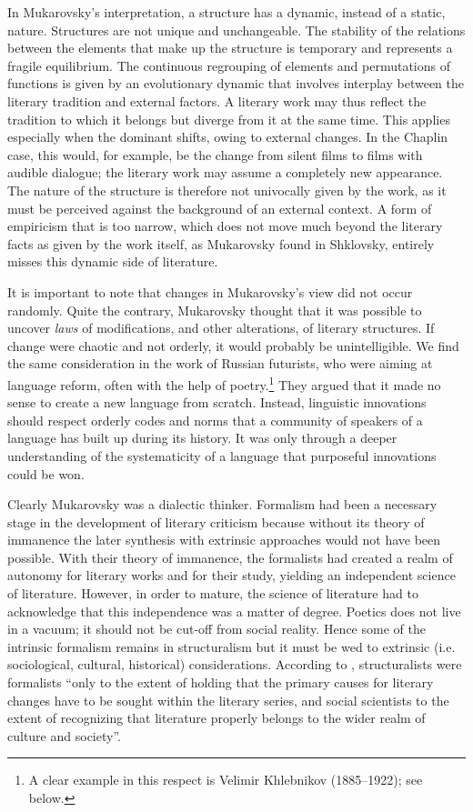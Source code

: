 \documentclass[output=paper]{langscibook}
\begin{document}
In Mukarovsky's interpretation, a structure has a dynamic, instead of a static, nature. Structures are not unique and unchangeable. The stability of the relations between the elements that make up the structure is temporary and represents a fragile equilibrium. The continuous regrouping of elements and permutations of functions is given by an evolutionary dynamic that involves interplay between the literary tradition and external factors. A literary work may thus reflect the tradition to which it belongs but diverge from it at the same time. This applies especially when the dominant shifts, owing to external changes. In the Chaplin case, this would, for example, be the change from silent films to films with audible dialogue; the literary work may assume a completely new appearance. The nature of the structure is therefore not univocally given by the work, as it must be perceived against the background of an external context. A form of empiricism that is too narrow, which does not move much beyond the literary facts as given by the work itself, as Mukarovsky found in Shklovsky, entirely misses this dynamic side of literature.

It is important to note that changes in Mukarovsky's view did not occur randomly. Quite the contrary, Mukarovsky thought that it was possible to uncover \emph{laws} of modifications, and other alterations, of literary structures. If change were chaotic and not orderly, it would probably be unintelligible. We find the same consideration in the work of Russian futurists, who were aiming at language reform, often with the help of poetry.\footnote{A clear example in this respect is Velimir Khlebnikov (1885--1922); see below.} They argued that it made no sense to create a new language from scratch. Instead, linguistic innovations should respect orderly codes and norms that a community of speakers of a language has built up during its history. It was only through a deeper understanding of the systematicity of a language that purposeful innovations could be won. 

Clearly Mukarovsky was a dialectic thinker. Formalism had been a necessary stage in the development of literary criticism because without its theory of immanence the later synthesis with extrinsic approaches would not have been possible. With their theory of immanence, the formalists had created a realm of autonomy for literary works and for their study, yielding an independent science of literature. However, in order to mature, the science of literature had to acknowledge that this independence was a matter of degree. Poetics does not live in a vacuum; it should not be cut-off from social reality. Hence some of the intrinsic formalism remains in structuralism but it must be wed to extrinsic (i.e. sociological, cultural, historical) considerations. According to \citet[38]{Galan1985}, structuralists were formalists ``only to the extent of holding that the primary causes for literary changes have to be sought within the literary series, and social scientists to the extent of recognizing that literature properly belongs to the wider realm of culture and society''.
\end{document}

